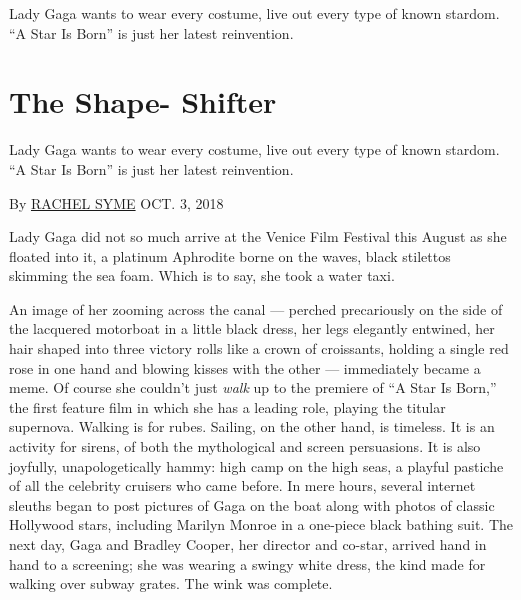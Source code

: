 Lady Gaga wants to wear every costume, live out every type of known
stardom. ``A Star Is Born'' is just her latest reinvention.

\hypertarget{the-shape--shifter}{%
\section{The Shape- Shifter}\label{the-shape--shifter}}

Lady Gaga wants to wear every costume, live out every type of known
stardom. ``A Star Is Born'' is just her latest reinvention.

By \href{https://www.nytimes3xbfgragh.onion/by/rachel-syme}{RACHEL SYME}
OCT. 3, 2018

Lady Gaga did not so much arrive at the Venice Film Festival this August
as she floated into it, a platinum Aphrodite borne on the waves, black
stilettos skimming the sea foam. Which is to say, she took a water taxi.

An image of her zooming across the canal --- perched precariously on the
side of the lacquered motorboat in a little black dress, her legs
elegantly entwined, her hair shaped into three victory rolls like a
crown of croissants, holding a single red rose in one hand and blowing
kisses with the other --- immediately became a meme. Of course she
couldn't just \emph{walk} up to the premiere of ``A Star Is Born,'' the
first feature film in which she has a leading role, playing the titular
supernova. Walking is for rubes. Sailing, on the other hand, is
timeless. It is an activity for sirens, of both the mythological and
screen persuasions. It is also joyfully, unapologetically hammy: high
camp on the high seas, a playful pastiche of all the celebrity cruisers
who came before. In mere hours, several internet sleuths began to post
pictures of Gaga on the boat along with photos of classic Hollywood
stars, including Marilyn Monroe in a one-piece black bathing suit. The
next day, Gaga and Bradley Cooper, her director and co-star, arrived
hand in hand to a screening; she was wearing a swingy white dress, the
kind made for walking over subway grates. The wink was complete.

